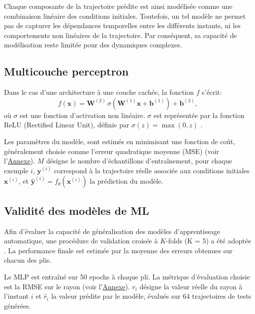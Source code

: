 \documentclass[
	a4paper, %
	10pt, %
	unnumberedsections, %
	twoside, %
]{LTJournalArticle}
\begin{document}
Chaque composante de la trajectoire prédite est ainsi modélisée comme une
combinaison linéaire des conditions initiales.
Toutefois, un tel modèle ne permet pas de capturer les dépendances
temporelles entre les différents instants, ni les
comportements non linéaires de la trajectoire. Par conséquent,
sa capacité de modélisation reste
limitée pour des dynamiques complexes.

\subsection{Multicouche perceptron}

Dans le cas d’une architecture à une couche cachée, la
fonction \( f \) s’écrit:
\[
    f(\mathbf{x}) = \mathbf{W}^{(2)} \, \sigma(\mathbf{W}^{(1)} \mathbf{x} + \mathbf{b}^{(1)}) + \mathbf{b}^{(2)},
\]
où \( \sigma \) est une fonction d’activation non linéaire. \( \sigma \) est
représentée par la fonction ReLU (Rectified Linear Unit), définie par \(
\sigma(z) = \max(0, z) \) \cite{ULB:INFOF422_Practical03} \cite{ScikitLearn:NeuralNetworksSupervised}.

Les paramètres du modèle, sont estimés en
minimisant une fonction de coût, généralement choisie comme l’erreur
quadratique moyenne (MSE) (voir l'\hyperref[app:ml-metrics]{Annexe}).
\( M \) désigne le nombre d’échantillons d’entraînement, pour chaque exemple
\( i \), \( \mathbf{y}^{(i)} \) correspond à la trajectoire réelle associée aux
conditions initiales \( \mathbf{x}^{(i)} \), et \( \hat{\mathbf{y}}^{(i)} =
f_{\theta}(\mathbf{x}^{(i)}) \) la prédiction du modèle.

\subsection{Validité des modèles de ML}

Afin d'évaluer la capacité de généralisation des modèles d'apprentissage
automatique, une procédure de validation croisée à $K$-folds (K = 5) a été adoptée \cite{GeeksforGeeks:CrossValidation} \cite{ULB:INFOF422_Practical03}.
La performance finale est estimée par la moyenne des
erreurs obtenues sur chacun des plis.

Le MLP est entraîné sur 50 epochs à
chaque pli. La métrique d'évaluation choisie est la RMSE sur le rayon (voir l'\hyperref[app:ml-metrics]{Annexe}).
$r_i$ désigne la valeur réelle du rayon à l'instant $i$ et $\hat{r}_i$ la
valeur prédite par le modèle, évalués sur 64
trajectoires de tests générées.
\end{document}
